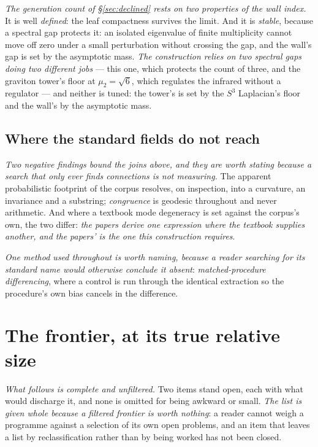 \documentclass[11pt,a4paper]{article}
\theoremstyle{plain}
\theoremstyle{definition}
\begin{document}
\emph{The generation count of \S\ref{sec:declined} rests on two properties of the wall index.} It is well
\emph{defined}: the leaf compactness survives the limit. And it is \emph{stable},
because a spectral gap protects it: an isolated eigenvalue of finite multiplicity cannot
move off zero under a small perturbation without crossing the gap, and the wall's gap is set by the
asymptotic mass. \emph{The construction relies on two spectral gaps doing two different jobs} ---
this one, which protects the count of three, and the graviton tower's floor at $\mu_{2}=\sqrt6$, which
regulates the infrared without a regulator --- and neither is tuned: the tower's is set by the $S^{3}$
Laplacian's floor and the wall's by the asymptotic mass.

\subsection{Where the standard fields do not reach}

\emph{Two negative findings bound the joins above, and they are worth stating because a search that only ever
finds connections is not measuring.} The apparent probabilistic footprint of the corpus resolves, on
inspection, into a curvature, an invariance and a substring; \emph{congruence} is geodesic
throughout and never arithmetic. And where a textbook mode degeneracy is set against the
corpus's own, the two differ: \emph{the papers derive one expression
where the textbook supplies another, and the papers' is the one this construction requires}.

\emph{One method used throughout is worth naming, because a reader searching for its standard name would
otherwise conclude it absent}: \emph{matched-procedure differencing}, where a control is run through the
identical extraction so the procedure's own bias cancels in the difference.


\section{The frontier, at its true relative size}\label{sec:frontier}

\emph{What follows is complete and unfiltered.} Two items stand open, each with what would discharge it,
and none is omitted for being awkward or small. \emph{The list is given whole because a filtered frontier is
worth nothing}: a reader cannot weigh a programme against a selection of its own open problems, and an item
that leaves a list by reclassification rather than by being worked has not been closed.
\end{document}
